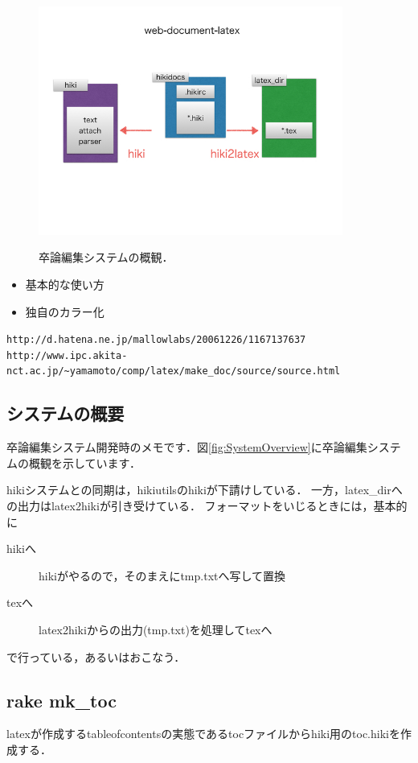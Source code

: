 \begin{figure}[htbp]\begin{center}
\includegraphics[width=10cm,bb= 0 0 737 553]{../figs/./hikiutils_bob.006.jpeg}
\caption{卒論編集システムの概観．}
\label{fig:SystemOverview}
\label{default}\end{center}\end{figure}
\begin{itemize}
\item 基本的な使い方\cite{listings1}
\item 独自のカラー化\cite{listings2}
\end{itemize}
\begin{thebibliography}{99}
  \verb|http://d.hatena.ne.jp/mallowlabs/20061226/1167137637|
  \verb|http://www.ipc.akita-nct.ac.jp/~yamamoto/comp/latex/make_doc/source/source.html|
\end{thebibliography}
\subsection{システムの概要}
卒論編集システム開発時のメモです．図\ref{fig:SystemOverview}に卒論編集システムの概観を示しています．

hikiシステムとの同期は，hikiutilsのhikiが下請けしている．
一方，latex\_dirへの出力はlatex2hikiが引き受けている．
フォーマットをいじるときには，基本的に
\begin{description}
\item[hikiへ] hikiがやるので，そのまえにtmp.txtへ写して置換

\item[texへ] latex2hikiからの出力(tmp.txt)を処理してtexへ

\end{description}
で行っている，あるいはおこなう．

\subsection{rake mk\_toc}
latexが作成するtableofcontentsの実態であるtocファイルからhiki用のtoc.hikiを作成する．

